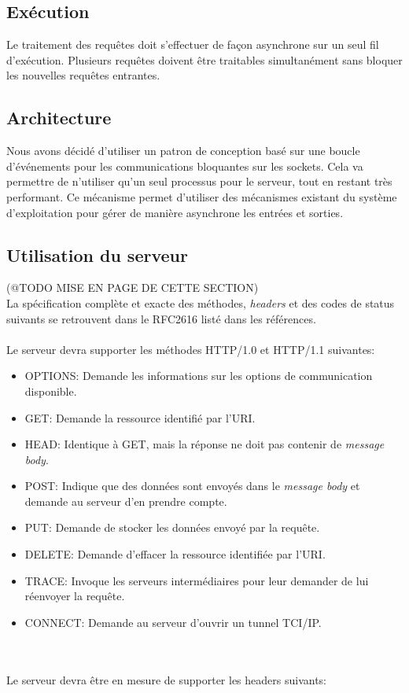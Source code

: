\documentclass{scrreprt}
\begin{document}
\subsection{Exécution}
Le traitement des requêtes doit s'effectuer de façon asynchrone sur un seul fil
d'exécution. Plusieurs requêtes doivent être traitables simultanément sans bloquer
les nouvelles requêtes entrantes.
\subsection{Architecture}
Nous avons décidé d'utiliser un patron de conception basé sur
une boucle d’événements pour les communications bloquantes sur les sockets. Cela va 
permettre de n'utiliser qu'un seul processus pour le serveur, tout en restant très performant.
Ce mécanisme permet d'utiliser des mécanismes existant du système d'exploitation
pour gérer de manière asynchrone les entrées et sorties\cite{c10k}.



\subsection{Utilisation du serveur}
(@TODO MISE EN PAGE DE CETTE SECTION)\\
La spécification complète et exacte des méthodes, \textit{headers} et des codes de status suivants se retrouvent dans le RFC2616 listé dans les références.\\\\
Le serveur devra supporter les méthodes HTTP/1.0 et HTTP/1.1 suivantes:\\
\begin{itemize}
 \item OPTIONS: Demande les informations sur les options de communication disponible.
 \item GET: Demande la ressource identifié par l'URI.
 \item HEAD: Identique à GET, mais la réponse ne doit pas contenir de \textit{message body}.
 \item POST: Indique que des données sont envoyés dans le \textit{message body} et demande au serveur d'en prendre compte.
 \item PUT: Demande de stocker les données envoyé par la requête.
 \item DELETE: Demande d'effacer la ressource identifiée par l'URI.
 \item TRACE: Invoque les serveurs intermédiaires pour leur demander de lui réenvoyer la requête.
 \item CONNECT: Demande au serveur d'ouvrir un tunnel TCI/IP.
 \\
\end{itemize}
\\\\
Le serveur devra être en mesure de supporter les headers suivants: \\
\end{document}
